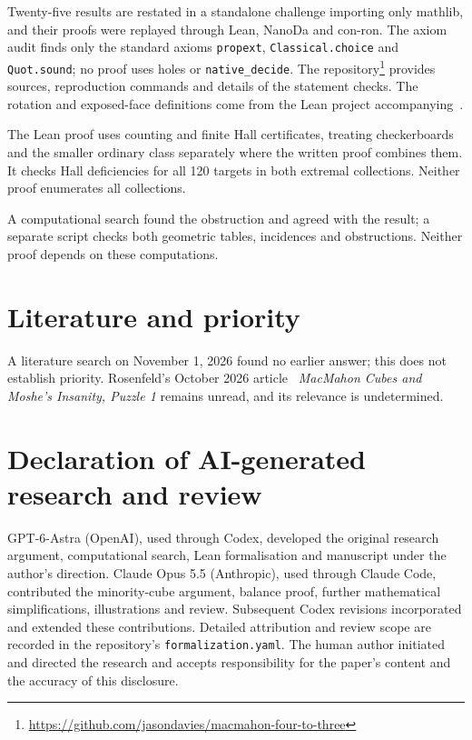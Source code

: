 \documentclass[11pt]{article}
\theoremstyle{remark}
\begin{document}
Twenty-five results are restated in a standalone challenge importing only
mathlib, and their proofs were replayed through Lean, NanoDa and con-ron.
The axiom audit finds only the standard axioms \texttt{propext},
\texttt{Classical.choice} and \texttt{Quot.sound}; no proof uses holes or
\texttt{native\_decide}. The repository\footnote{\url{https://github.com/jasondavies/macmahon-four-to-three}}
provides sources, reproduction commands and details of the statement checks.
The rotation and exposed-face definitions come from the Lean project
accompanying~\cite{MinUniversal}.

The Lean proof uses counting and finite Hall certificates, treating
checkerboards and the smaller ordinary class separately where the written
proof combines them. It checks Hall deficiencies for all 120 targets in
both extremal collections. Neither proof enumerates all collections.

A computational search found the obstruction and agreed with the result;
a separate script checks both geometric tables, incidences and obstructions.
Neither proof depends on these computations.

\section*{Literature and priority}
A literature search on November 1, 2026 found no earlier answer; this
does not establish priority. Rosenfeld's October 2026 article~\cite{Rosenfeld}
\emph{MacMahon Cubes and Moshe's Insanity, Puzzle 1} remains unread,
and its relevance is undetermined.

\section*{Declaration of AI-generated research and review}
GPT-6-Astra (OpenAI), used through Codex, developed the original research
argument, computational search, Lean formalisation and manuscript under
the author's direction. Claude Opus 5.5 (Anthropic), used through Claude
Code, contributed the minority-cube argument, balance proof, further
mathematical simplifications, illustrations and review. Subsequent Codex
revisions incorporated and extended these contributions. Detailed attribution
and review scope are recorded in the repository's \texttt{formalization.yaml}.
The human author initiated and directed the research and accepts responsibility
for the paper's content and the accuracy of this disclosure.
\end{document}
